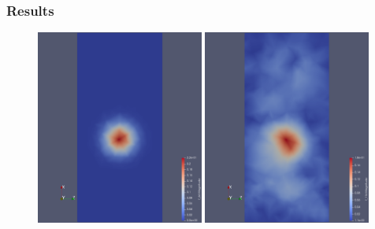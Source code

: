 \documentclass[
  pdf,
  10pt,
  xcolor={svgnames},
]{beamer}
\begin{document}
\begin{frame}
  \frametitle{Results}
  \begin{figure}
    \centering
    \includegraphics[width=0.49\textwidth]{./resources/true_param}
    \includegraphics[width=0.49\textwidth]{./resources/posterior_sample}
  \end{figure}
\end{frame}

\end{document}
